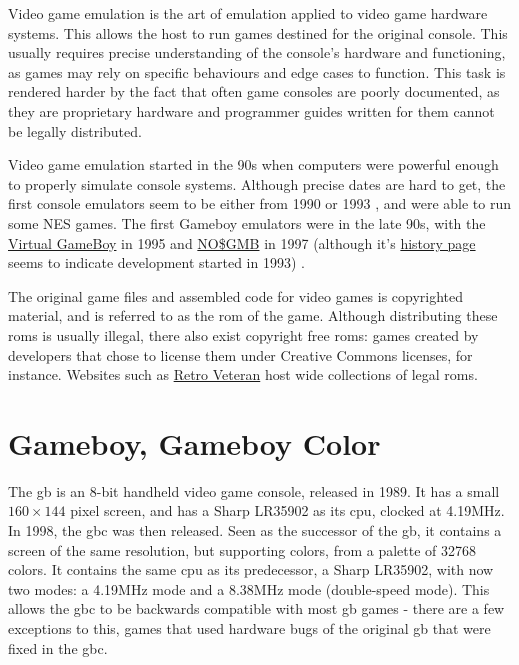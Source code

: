 \documentclass[11pt]{report}
\begin{document}
Video game emulation is the art of emulation applied to video game hardware systems. This allows the host to run games destined for the original console. This usually requires precise understanding of the console's hardware and functioning, as games may rely on specific behaviours and edge cases to function. This task is rendered harder by the fact that often game consoles are poorly documented, as they are proprietary hardware and programmer guides written for them cannot be legally distributed.

Video game emulation started in the 90s when computers were powerful enough to properly simulate console systems. Although precise dates are hard to get, the first console emulators seem to be either from 1990 or 1993 \cite{first_nes_emu}, and were able to run some NES games. The first Gameboy emulators were in the late 90s, with the \href{http://fms.komkon.org/VGB/}{Virtual GameBoy} in 1995 and \href{https://problemkaputt.de/gmb.htm}{NO\$GMB} in 1997 (although it's \href{https://problemkaputt.de/gmbhist.htm}{history page} seems to indicate development started in 1993) \cite{first_gb_emus}.

The original game files and assembled code for video games is copyrighted material, and is referred to as the \gls{rom} of the game. Although distributing these \glspl{rom} is usually illegal, there also exist copyright free \glspl{rom}: games created by developers that chose to license them under Creative Commons licenses, for instance. Websites such as \href{https://www.retroveteran.com/category/nintendo-game-boy-color/}{Retro Veteran} host wide collections of legal \glspl{rom}.

\section{Gameboy, Gameboy Color}

The \gls{gb} is an 8-bit handheld video game console, released in 1989. It has a small $160 \times 144$ pixel screen, and has a Sharp LR35902 as its \gls{cpu}, clocked at 4.19MHz. In 1998, the \gls{gbc} was then released. Seen as the successor of the \gls{gb}, it contains a screen of the same resolution, but supporting colors, from a palette of 32768 colors. It contains the same \gls{cpu} as its predecessor, a Sharp LR35902, with now two modes: a 4.19MHz mode and a 8.38MHz mode (double-speed mode). This allows the \gls{gbc} to be backwards compatible with most \gls{gb} games - there are a few exceptions to this, games that used hardware bugs of the original \gls{gb} that were fixed in the \gls{gbc}.
\end{document}
